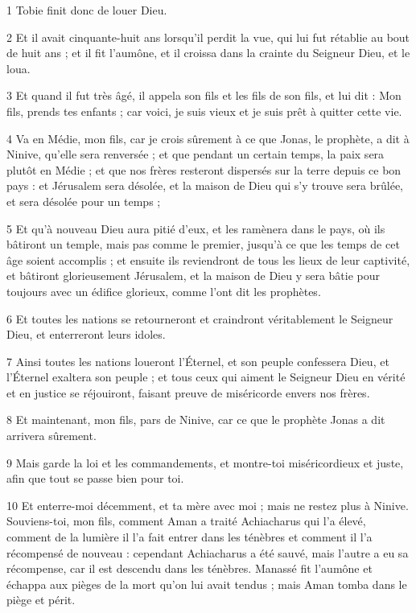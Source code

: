 \par 1 Tobie finit donc de louer Dieu.
\par 2 Et il avait cinquante-huit ans lorsqu'il perdit la vue, qui lui fut rétablie au bout de huit ans ; et il fit l'aumône, et il croissa dans la crainte du Seigneur Dieu, et le loua.
\par 3 Et quand il fut très âgé, il appela son fils et les fils de son fils, et lui dit : Mon fils, prends tes enfants ; car voici, je suis vieux et je suis prêt à quitter cette vie.
\par 4 Va en Médie, mon fils, car je crois sûrement à ce que Jonas, le prophète, a dit à Ninive, qu'elle sera renversée ; et que pendant un certain temps, la paix sera plutôt en Médie ; et que nos frères resteront dispersés sur la terre depuis ce bon pays : et Jérusalem sera désolée, et la maison de Dieu qui s'y trouve sera brûlée, et sera désolée pour un temps ;
\par 5 Et qu'à nouveau Dieu aura pitié d'eux, et les ramènera dans le pays, où ils bâtiront un temple, mais pas comme le premier, jusqu'à ce que les temps de cet âge soient accomplis ; et ensuite ils reviendront de tous les lieux de leur captivité, et bâtiront glorieusement Jérusalem, et la maison de Dieu y sera bâtie pour toujours avec un édifice glorieux, comme l'ont dit les prophètes.
\par 6 Et toutes les nations se retourneront et craindront véritablement le Seigneur Dieu, et enterreront leurs idoles.
\par 7 Ainsi toutes les nations loueront l'Éternel, et son peuple confessera Dieu, et l'Éternel exaltera son peuple ; et tous ceux qui aiment le Seigneur Dieu en vérité et en justice se réjouiront, faisant preuve de miséricorde envers nos frères.
\par 8 Et maintenant, mon fils, pars de Ninive, car ce que le prophète Jonas a dit arrivera sûrement.
\par 9 Mais garde la loi et les commandements, et montre-toi miséricordieux et juste, afin que tout se passe bien pour toi.
\par 10 Et enterre-moi décemment, et ta mère avec moi ; mais ne restez plus à Ninive. Souviens-toi, mon fils, comment Aman a traité Achiacharus qui l'a élevé, comment de la lumière il l'a fait entrer dans les ténèbres et comment il l'a récompensé de nouveau : cependant Achiacharus a été sauvé, mais l'autre a eu sa récompense, car il est descendu dans les ténèbres. Manassé fit l'aumône et échappa aux pièges de la mort qu'on lui avait tendus ; mais Aman tomba dans le piège et périt.
